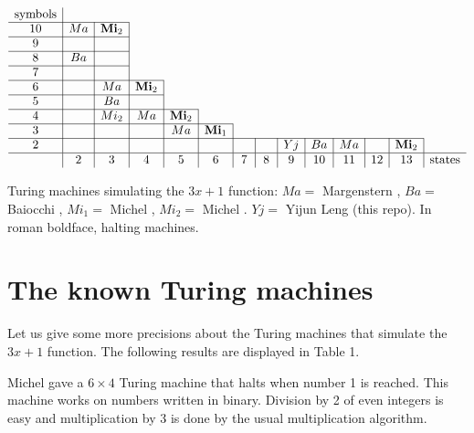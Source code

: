\documentclass[10pt]{article}
\begin{document}
\begin{table}
$$\begin{array}{c|c|c|c|c|c|c|c|c|c|c|c|c|c}
\mbox{symbols} & \multicolumn{13}{c}{}\\                                                \cline{1-3}
10             & Ma    & \mbox{\bf Mi}_2& \multicolumn{11}{c}{}\\                       \cline{1-3}
9              &       &      &\multicolumn{11}{c}{}\\                                  \cline{1-3}
8              & Ba    &      &\multicolumn{11}{c}{}\\                                  \cline{1-3}
7              &       &      &\multicolumn{11}{c}{}\\                                  \cline{1-4}
6              &       & Ma   &  \mbox{\bf Mi}_2 & \multicolumn{10}{c}{}\\          \cline{1-4}
5              &       & Ba   &                  & \multicolumn{10}{c}{}\\          \cline{1-5}
4              &       & Mi_2 & Ma               &\mbox{\bf Mi}_2 & \multicolumn{9}{c}{}\\         \cline{1-6}
3              &       &      &                  & Ma   &\mbox{\bf Mi}_1 & \multicolumn{8}{c}{}\\  \cline{1-13}
2              &       &      &    &      &      &     &     & Yj  & Ba  & Ma & & \mbox{\bf Mi}_2\\  \hline
               & 2     & 3    & 4  & 5    &\,6\, &\,7\,&\,8\,&\,9\,& 10  & 11 & 12 & 13 & \mbox{states}
\end{array}$$
\caption{Turing machines simulating the $3x + 1$ function:
$Ma=$ Margenstern \cite{Ma98,Ma00},
$Ba=$ Baiocchi \cite{Ba98},
$Mi_1=$ Michel \cite{Mi93},
$Mi_2=$ Michel \cite{Mi14}.
$Yj=$ Yijun Leng (this repo).
In roman boldface, halting machines.}
\end{table}

\section{The known Turing machines}
Let us give some more precisions about the Turing machines that simulate
the $3x + 1$ function. The following results are displayed in Table 1.

Michel \cite{Mi93} gave a $6 \times 4$ Turing machine that halts when number 1 is reached.
This machine works on numbers written in binary. Division by 2 of even integers
is easy and multiplication by 3 is done by the usual multiplication algorithm.
\end{document}
